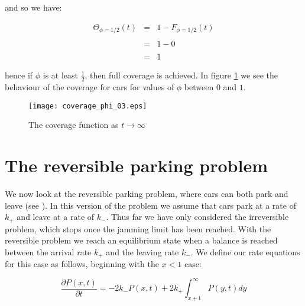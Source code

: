 and so we have: \bigskip

%
%

\begin{eqnarray*}
	\Theta_{\phi = 1/2}(t) & = & 1 - F_{\phi = 1/2}(t) \\\\
						   & = & 1 - 0 \\\\
						   & = & 1 
\end{eqnarray*}\medskip

hence if $\phi$ is at least $\frac{1}{2}$, then full coverage is achieved. In figure \ref{fig:cp3} 
we see the behaviour of the coverage for cars for values of $\phi$ between $0$ and $1$. \bigskip

\begin{figure}[h!]
	\centering
	\texttt{[image: coverage\_phi\_03.eps]}
	\caption{The coverage function as $t \to \infty$}
	\label{fig:cp3}
\end{figure}\medskip












\section{The reversible parking problem}

We now look at the reversible parking problem, where cars can both park and 
leave (see \cite{krapivsky1994collective}). In this version of the problem we 
assume that cars park at a rate of $k_{+}$ and leave at a rate of $k_{-}$. Thus 
far we have only considered the irreversible problem, which stops once the 
jamming limit has been reached. With the reversible problem we reach an 
equilibrium state when a balance is reached between the arrival rate $k_{+}$ 
and the leaving rate $k_{-}$. We define our rate equations for this case as 
follows, beginning with the $x < 1$ case: \bigskip

\[
	\frac{\partial P(x, t)}{\partial t} = -2 k_{-} P(x, t) + 2 k_{+} \int_{x + 1}^{\infty} P(y, t) dy  
\]\medskip

